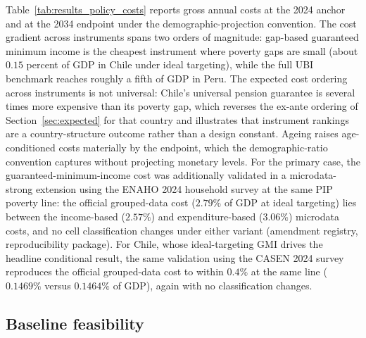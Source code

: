 \documentclass[11pt,a4paper]{article}
\begin{document}
Table~\ref{tab:results_policy_costs} reports gross annual costs at the 2024 anchor and at
the 2034 endpoint under the demographic-projection convention. The cost gradient across instruments spans two orders of
magnitude: gap-based guaranteed minimum income is the cheapest instrument where poverty gaps
are small (about $0.15$ percent of GDP in Chile under ideal targeting), while the full UBI
benchmark reaches roughly a fifth of GDP in Peru. The expected cost ordering across
instruments is not universal: Chile's universal pension guarantee is several times more
expensive than its poverty gap, which reverses the ex-ante ordering of
Section~\ref{sec:expected} for that country and illustrates that instrument rankings are a
country-structure outcome rather than a design constant. Ageing raises age-conditioned
costs materially by the endpoint, which the demographic-ratio convention captures without
projecting monetary levels. For the primary case, the guaranteed-minimum-income cost was
additionally validated in a microdata-strong extension using the ENAHO 2024 household survey
at the same PIP poverty line: the official grouped-data cost ($2.79\%$ of GDP at ideal
targeting) lies between the income-based ($2.57\%$) and expenditure-based ($3.06\%$)
microdata costs, and no cell classification changes under either variant (amendment registry,
reproducibility package). For Chile, whose ideal-targeting GMI drives the headline conditional
result, the same validation using the CASEN 2024 survey reproduces the official grouped-data
cost to within $0.4\%$ at the same line ($0.1469\%$ versus $0.1464\%$ of GDP), again with no
classification changes.



\subsection{Baseline feasibility}\label{subsec:results_baseline}
\end{document}
